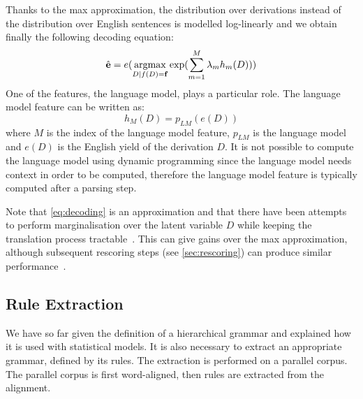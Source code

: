     Thanks to the max approximation, the distribution over derivations instead of the distribution over English
    sentences is modelled log-linearly and we obtain finally the following decoding equation:
%
    \begin{equation} \label{eq:decoding}
      \hat{{\bf e}} = e(\operatorname*{argmax}_{D | f(D) = {\bf f}} \exp(\sum_{m=1}^M \lambda_m h_m(D)))
    \end{equation}
%
    One of the features, the language model, plays a particular role. The language model feature can be written as:
%    
    \begin{equation}
      h_M(D) = p_{LM}(e(D))
    \end{equation}
%
    where $M$ is the index of the language model feature, $p_{LM}$ is the language model and $e(D)$ is the English
    yield of the derivation $D$. It is not possible to compute the language model using dynamic programming since
    the language model needs context in order to be computed, therefore the language model feature is typically
    computed after a parsing step. %
    
    Note that \autoref{eq:decoding} is an approximation and that there have been attempts to perform marginalisation over the latent variable 
    $D$ while keeping the translation process tractable~\citep{blunsom-cohn-osborne:2008:ACL,degispert-iglesias-blackwood-banga-byrne:2010:CL}.
    This can give gains over the max approximation, although subsequent rescoring
    steps (see \autoref{sec:rescoring}) can produce similar performance~\citep{degispert-iglesias-blackwood-banga-byrne:2010:CL}.


  \subsection{Rule Extraction} \label{sec:hierruleextract}

  We have so far given the definition of a hierarchical grammar and explained how it is used with statistical models.
  It is also necessary to extract an appropriate grammar, defined by its rules. The extraction
  is performed on a parallel corpus. The parallel corpus is first word-aligned, then
  rules are extracted from the alignment.

